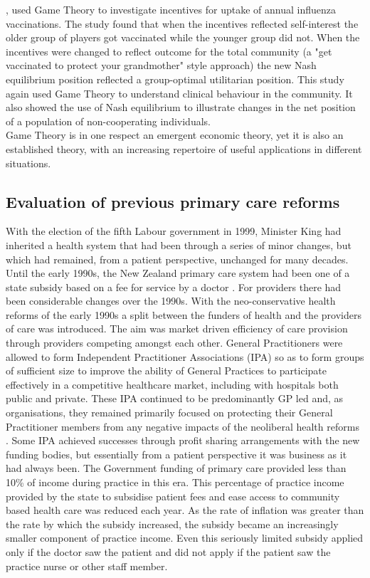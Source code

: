 \documentclass[11pt,a4paper]{article}
\begin{document}
\citet{chapman2012using}, used Game Theory to investigate incentives for uptake of annual influenza vaccinations.  The study found that when the incentives reflected self-interest the older group of players got vaccinated while the younger group did not. When the incentives were changed to reflect outcome for the total community (a "get vaccinated to protect your grandmother" style approach) the new Nash equilibrium position reflected a group-optimal utilitarian position. This study again used Game Theory to understand clinical behaviour in the community. It also showed the use of Nash equilibrium to illustrate changes in the net position of a population of non-cooperating individuals. \\

Game Theory is in one respect an emergent economic theory, yet it is also an established theory, with an increasing repertoire of useful applications in different situations. \\

\subsection{Evaluation of previous primary care reforms}
With the election of the fifth Labour government in 1999, Minister King had inherited a health system that had been through a series of minor changes, but which had remained, from a patient perspective, unchanged for many decades. Until the early 1990s, the New Zealand primary care system had been one of a state subsidy based on a fee for service by a doctor \citep{gauld2006new}. For providers there had been considerable changes over the 1990s. With the neo-conservative health reforms of the early 1990s a split between the funders of health and the providers of care was introduced. The aim was market driven efficiency of care provision through providers competing amongst each other. General Practitioners were allowed to form Independent Practitioner Associations (IPA) so as to form groups of sufficient size to improve the ability of General Practices to participate effectively in a competitive healthcare market, including with hospitals both public and private. These IPA continued to be predominantly GP led and, as organisations, they remained primarily focused on protecting their General Practitioner members from any negative impacts of the neoliberal health reforms \citep{malcolm1999new}. Some IPA achieved successes through profit sharing arrangements with the new funding bodies, but essentially from a patient perspective it was business as it had always been. The Government funding of primary care provided less than 10\% of income during practice in this era. This percentage of practice income provided by the state to subsidise patient fees and ease access to community based health care was reduced each year. As the rate of inflation was greater than the rate by which the subsidy increased, the subsidy became an increasingly smaller component of practice income. Even this seriously limited subsidy applied only if the doctor saw the patient and did not apply if the patient saw the practice nurse or other staff member. \\    
\end{document}
